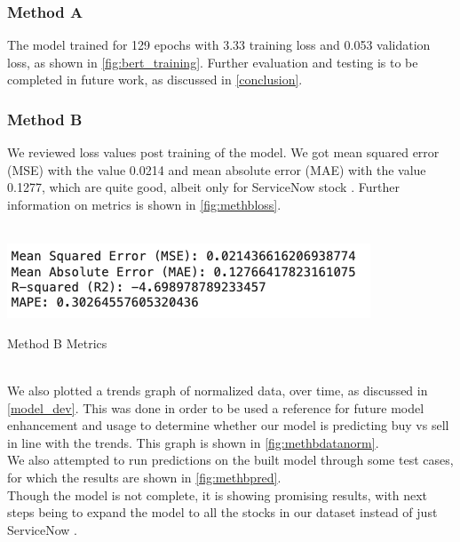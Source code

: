 \documentclass[twocolumn,12pt]{article}
\makeatletter
\newenvironment{figurehere}
  {\def\@captype{figure}}
  {}
\makeatother
\begin{document}
\begin{flushleft}
		\subsubsection{Method A \cite{metha}} \label{method_a}
		The model trained for 129 epochs with 3.33 training loss and 0.053 validation loss, as shown in \cref{fig:bert_training}. Further evaluation and testing is to be completed in future work, as discussed in \cref{conclusion}.
		
		\subsubsection{Method B \cite{methb}} \label{method_b}
		We reviewed loss values post training of the model. We got mean squared error (MSE) with the value 0.0214 and mean absolute error (MAE) with the value 0.1277, which are quite good, albeit only for ServiceNow stock \cite{snow}. Further information on metrics is shown in \cref{fig:methbloss}.
		
		\mbox{}\\
		\begin{figurehere}
			\centering
			\includegraphics[width=0.7\linewidth]{images/methbloss.png}
			\caption{Method B Metrics}
			\label{fig:methbloss}
		\end{figurehere}
		\mbox{}\\
		
		We also plotted a trends graph of normalized data, over time, as discussed in \cref{model_dev}. This was done in order to be used a reference for future model enhancement and usage to determine whether our model is predicting buy vs sell in line with the trends. This graph is shown in \cref{fig:methbdatanorm}.\\		
		We also attempted to run predictions on the built model through some test cases, for which the results are shown in \cref{fig:methbpred}.\\
		Though the model is not complete, it is showing promising results, with next steps being to expand the model to all the stocks in our dataset instead of just ServiceNow \cite{snow}.		
		

\end{flushleft}
\end{document}
